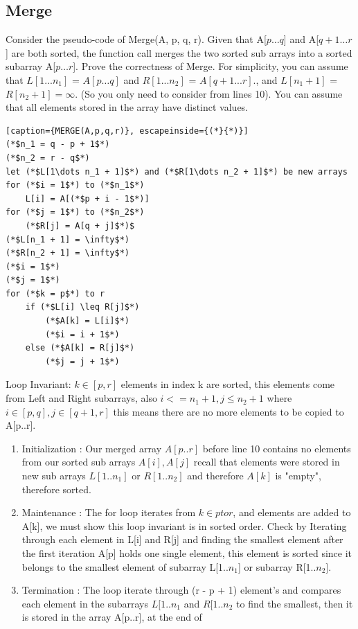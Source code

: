 \documentclass[11pt,fleqn]{book}
\begin{document}
\subsection{Merge}
\begin{example}
Consider the pseudo-code of Merge(A, p, q, r). Given that A[$p\dots q$] and A[$q+ 1\dots r$] are both sorted, the function call merges the two sorted sub arrays into a sorted subarray A[$p\dots r$].  Prove the correctness of Merge.  For simplicity,  you can assume that $L[1...n_1]$ = $A[p\dots q]$ and $R[1...n_2]$ = $A[q+1...r]$., and $L[n_1+1]$ = $R[n_2+1] = \infty$. (So you only need to consider from lines 10).  You can assume that all elements stored in the array have distinct values. 
\end{example}

\begin{lstlisting}[caption={MERGE(A,p,q,r)}, escapeinside={(*}{*)}]
(*$n_1 = q - p + 1$*)
(*$n_2 = r - q$*)
let (*$L[1\dots n_1 + 1]$*) and (*$R[1\dots n_2 + 1]$*) be new arrays 
for (*$i = 1$*) to (*$n_1$*)
    L[i] = A[(*$p + i - 1$*)]
for (*$j = 1$*) to (*$n_2$*)
    (*$R[j] = A[q + j]$*)$
(*$L[n_1 + 1] = \infty$*)
(*$R[n_2 + 1] = \infty$*)
(*$i = 1$*)
(*$j = 1$*)
for (*$k = p$*) to r 
    if (*$L[i] \leq R[j]$*)
        (*$A[k] = L[i]$*)
        (*$i = i + 1$*)
    else (*$A[k] = R[j]$*)
        (*$j = j + 1$*)
\end{lstlisting} 
    \vspace{1em}
    Loop Invariant: $k \in [p,r]$ elements in index k are sorted, this elements come from Left and Right subarrays, also $i <= n_1 + 1, j \leq n_2 + 1$ where $i \in [p,q], j \in [q+1,r]$ this means there are no more elements to be copied to A[p..r].
    \vspace{1em}
\begin{enumerate}
    \item Initialization : Our merged array $A[p..r]$ before line 10 contains no elements from our sorted sub arrays $A[i] , A[j]$ recall that elements were stored in new sub arrays $L[1..n_1]$ or $R[1..n_2]$ and therefore $A[k]$ is "empty", therefore sorted. 
    \item Maintenance :  The for loop iterates from $k \in p to r$, and elements are added to A[k], we must show this loop invariant is in sorted order. Check by Iterating through each element in L[i] and R[j] and finding the smallest element after the first iteration A[p] holds one single element, this element is sorted since it belongs to the smallest element of subarray L[1..$n_1$] or subarray R[1..$n_2$]. 
    \item Termination : The loop iterate through (r - p + 1) element's and compares each element in the subarrays $L[1..n_1$ and $R[1..n_2$ to find the smallest, then it is stored in the array A[p..r], at the end of
\end{enumerate}
\end{document}

